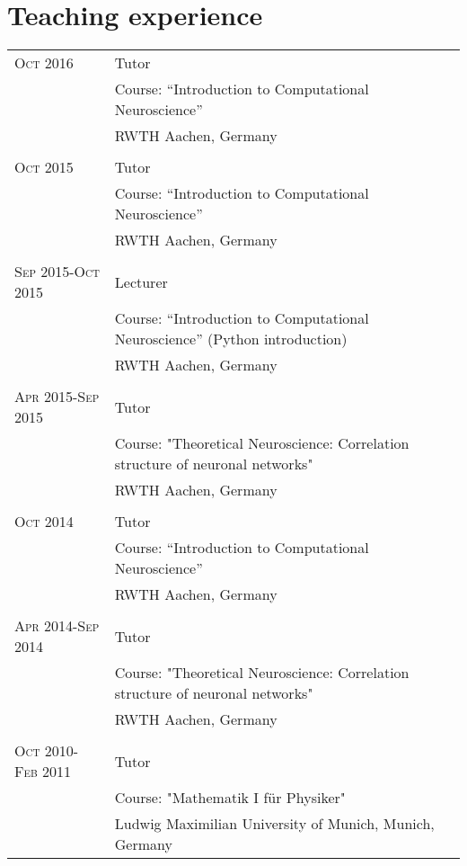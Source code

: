 \documentclass[a4paper,10pt]{article}
\begin{document}
\section{Teaching experience}
\begin{tabular}{>{\hfill}p{3.15cm}|p{10.4cm}}
  \textsc{Oct} 2016 & Tutor \\
  & \footnotesize Course: ``Introduction to Computational Neuroscience'' \\
  & \footnotesize RWTH Aachen, Germany \\
  \multicolumn{2}{c}{} \\
  \textsc{Oct} 2015 & Tutor \\
  & \footnotesize Course: ``Introduction to Computational Neuroscience'' \\
  & \footnotesize RWTH Aachen, Germany \\
  \multicolumn{2}{c}{} \\
  \textsc{Sep} 2015-\textsc{Oct} 2015 & Lecturer \\
  & \footnotesize Course: ``Introduction to Computational Neuroscience'' (Python introduction) \\
  & \footnotesize RWTH Aachen, Germany \\
  \multicolumn{2}{c}{} \\
  \textsc{Apr} 2015-\textsc{Sep} 2015 & Tutor \\ 
  & \footnotesize Course: "Theoretical Neuroscience: Correlation structure of neuronal networks" \\
  & \footnotesize RWTH Aachen, Germany \\
  \multicolumn{2}{c}{} \\
  \textsc{Oct} 2014 & Tutor \\
  & \footnotesize Course: ``Introduction to Computational Neuroscience'' \\
  & \footnotesize RWTH Aachen, Germany \\
  \multicolumn{2}{c}{} \\
  \textsc{Apr} 2014-\textsc{Sep} 2014 & Tutor \\ 
  & \footnotesize Course: "Theoretical Neuroscience: Correlation structure of neuronal networks" \\
  & \footnotesize RWTH Aachen, Germany \\
  \multicolumn{2}{c}{} \\
  \textsc{Oct} 2010-\textsc{Feb} 2011 & Tutor \\
  & \footnotesize Course: "Mathematik I f\"ur Physiker" \\
  & \footnotesize Ludwig Maximilian University of Munich, Munich, Germany \\
\end{tabular}
\end{document}

